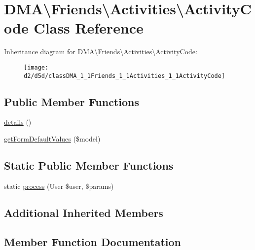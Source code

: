 \hypertarget{classDMA_1_1Friends_1_1Activities_1_1ActivityCode}{}\section{D\+M\+A\textbackslash{}Friends\textbackslash{}Activities\textbackslash{}Activity\+Code Class Reference}
\label{classDMA_1_1Friends_1_1Activities_1_1ActivityCode}
Inheritance diagram for D\+M\+A\textbackslash{}Friends\textbackslash{}Activities\textbackslash{}Activity\+Code\+:\begin{figure}[H]
\begin{center}
\leavevmode
\texttt{[image: d2/d5d/classDMA\_1\_1Friends\_1\_1Activities\_1\_1ActivityCode]}
\end{center}
\end{figure}
\subsection*{Public Member Functions}
\begin{DoxyCompactItemize}
\item 
\hyperlink{classDMA_1_1Friends_1_1Activities_1_1ActivityCode_a531ba09241d4bf7c0ad9d862422563c0}{details} ()
\item 
\hyperlink{classDMA_1_1Friends_1_1Activities_1_1ActivityCode_a13eb870ac4e33b0b3d522f0e28444e7e}{get\+Form\+Default\+Values} (\$model)
\end{DoxyCompactItemize}
\subsection*{Static Public Member Functions}
\begin{DoxyCompactItemize}
\item 
static \hyperlink{classDMA_1_1Friends_1_1Activities_1_1ActivityCode_a3de9ef142396ba94532566598b508d58}{process} (User \$user, \$params)
\end{DoxyCompactItemize}
\subsection*{Additional Inherited Members}


\subsection{Member Function Documentation}
\hypertarget{classDMA_1_1Friends_1_1Activities_1_1ActivityCode_a531ba09241d4bf7c0ad9d862422563c0}{}
